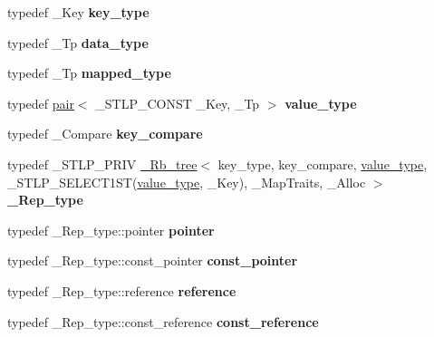 \begin{DoxyCompactItemize}
\item 
\mbox{\label{classmap_a16fbe701657aad28d8ffdd97feefca4c}} 
typedef \+\_\+\+Key {\bfseries key\+\_\+type}
\item 
\mbox{\label{classmap_a6e8fdbbe170f9e57a7afdff6fd7b3f23}} 
typedef \+\_\+\+Tp {\bfseries data\+\_\+type}
\item 
\mbox{\label{classmap_ae2df374e842f8546987cbb6fd3b345b3}} 
typedef \+\_\+\+Tp {\bfseries mapped\+\_\+type}
\item 
\mbox{\label{classmap_a00c143f9a94cf46ed12c9744e471997c}} 
typedef \hyperlink{structpair}{pair}$<$ \+\_\+\+S\+T\+L\+P\+\_\+\+C\+O\+N\+ST \+\_\+\+Key, \+\_\+\+Tp $>$ {\bfseries value\+\_\+type}
\item 
\mbox{\label{classmap_ab64254157bef7f1e3089045f6f08ee2c}} 
typedef \+\_\+\+Compare {\bfseries key\+\_\+compare}
\item 
\mbox{\label{classmap_ad522721e89881c00e934ce3a3ed5260d}} 
typedef \+\_\+\+S\+T\+L\+P\+\_\+\+P\+R\+IV \hyperlink{class___rb__tree}{\+\_\+\+Rb\+\_\+tree}$<$ key\+\_\+type, key\+\_\+compare, \hyperlink{structpair}{value\+\_\+type}, \+\_\+\+S\+T\+L\+P\+\_\+\+S\+E\+L\+E\+C\+T1\+ST(\hyperlink{structpair}{value\+\_\+type}, \+\_\+\+Key), \+\_\+\+Map\+Traits, \+\_\+\+Alloc $>$ {\bfseries \+\_\+\+Rep\+\_\+type}
\item 
\mbox{\label{classmap_aae75906d2b4406817a144e517d4dc298}} 
typedef \+\_\+\+Rep\+\_\+type\+::pointer {\bfseries pointer}
\item 
\mbox{\label{classmap_a538f5ad424d3df9df3fada3e60dc13d9}} 
typedef \+\_\+\+Rep\+\_\+type\+::const\+\_\+pointer {\bfseries const\+\_\+pointer}
\item 
\mbox{\label{classmap_a59ae762f90d5575c1294307b05eb328a}} 
typedef \+\_\+\+Rep\+\_\+type\+::reference {\bfseries reference}
\item 
\mbox{\label{classmap_a0504b3141f6de6c19f15eb3e9b4d6939}} 
typedef \+\_\+\+Rep\+\_\+type\+::const\+\_\+reference {\bfseries const\+\_\+reference}

\end{DoxyCompactItemize}

